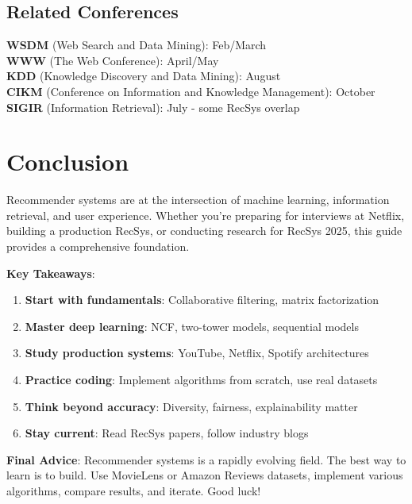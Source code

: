 \documentclass[10pt]{article}
\begin{document}
\subsection{Related Conferences}

\textbf{WSDM} (Web Search and Data Mining): Feb/March \\
\textbf{WWW} (The Web Conference): April/May \\
\textbf{KDD} (Knowledge Discovery and Data Mining): August \\
\textbf{CIKM} (Conference on Information and Knowledge Management): October \\
\textbf{SIGIR} (Information Retrieval): July - some RecSys overlap

\section{Conclusion}

Recommender systems are at the intersection of machine learning, information retrieval, and user experience. Whether you're preparing for interviews at Netflix, building a production RecSys, or conducting research for RecSys 2025, this guide provides a comprehensive foundation.

\textbf{Key Takeaways}:
\begin{enumerate}[leftmargin=*]
    \item \textbf{Start with fundamentals}: Collaborative filtering, matrix factorization
    \item \textbf{Master deep learning}: NCF, two-tower models, sequential models
    \item \textbf{Study production systems}: YouTube, Netflix, Spotify architectures
    \item \textbf{Practice coding}: Implement algorithms from scratch, use real datasets
    \item \textbf{Think beyond accuracy}: Diversity, fairness, explainability matter
    \item \textbf{Stay current}: Read RecSys papers, follow industry blogs
\end{enumerate}

\textbf{Final Advice}: Recommender systems is a rapidly evolving field. The best way to learn is to build. Use MovieLens or Amazon Reviews datasets, implement various algorithms, compare results, and iterate. Good luck!
\end{document}
